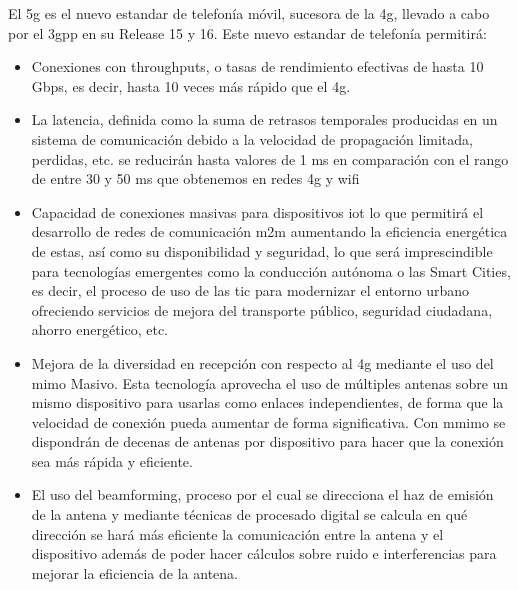 \par El \gls{5g} es el nuevo estandar de telefonía móvil, sucesora de la \gls{4g}, llevado a cabo por el \gls{3gpp} en su Release 15 y 16. Este nuevo estandar de telefonía permitirá:
\begin{itemize}
\item Conexiones con throughputs, o tasas de rendimiento efectivas de hasta 10 Gbps, es decir, hasta 10 veces más rápido que el \gls{4g}.
\item La latencia, definida como la suma de retrasos temporales producidas en un sistema de comunicación debido a la velocidad de propagación limitada, perdidas, etc. se reducirán hasta valores de 1 ms en comparación con el rango de entre 30 y 50 ms que obtenemos en redes \gls{4g} y \gls{wifi}
\item Capacidad de conexiones masivas para dispositivos \gls{iot} lo que permitirá  el desarrollo de redes de comunicación \gls{m2m} aumentando la eficiencia energética de estas, así como su disponibilidad y seguridad, lo que será imprescindible para tecnologías emergentes como la conducción autónoma o las Smart Cities, es decir, el proceso de uso de las \gls{tic} para modernizar el entorno urbano ofreciendo servicios de mejora del transporte público, seguridad ciudadana, ahorro energético, etc.
\item Mejora de la diversidad en recepción con respecto al \gls{4g} mediante el uso del \gls{mimo} Masivo. Esta tecnología aprovecha el uso de múltiples antenas sobre un mismo dispositivo para usarlas como enlaces independientes, de forma que la velocidad de conexión pueda aumentar de forma significativa. Con \gls{mmimo} se dispondrán de decenas de antenas por dispositivo para hacer que la conexión sea más rápida y eficiente.
\item El uso del beamforming, proceso por el cual se direcciona el haz de emisión de la antena y mediante técnicas de procesado digital se calcula en qué dirección se hará más eficiente la comunicación entre la antena y el dispositivo además de poder hacer cálculos sobre ruido e interferencias para mejorar la eficiencia de la antena.
\end{itemize}

